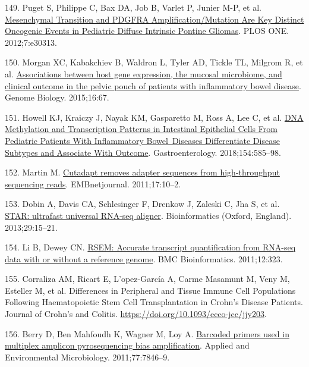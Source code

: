 \documentclass[
  12pt,
  a4paper,
  twoside,
  openright]{book}
\newlength{\cslhangindent}
\newlength{\cslentryspacingunit} %
\newenvironment{CSLReferences}[2] %
 {%
  \setlength{\parindent}{0pt}
  \ifodd #1
  \let\oldpar\par
  \def\par{\hangindent=\cslhangindent\oldpar}
  \fi
  \setlength{\parskip}{#2\cslentryspacingunit}
 }%
 {}
\begin{document}
\begin{CSLReferences}{0}{0}
\leavevmode{}%
149. Puget S, Philippe C, Bax DA, Job B, Varlet P, Junier M-P, et al. \href{https://doi.org/10.1371/journal.pone.0030313}{Mesenchymal Transition and PDGFRA Amplification/Mutation Are Key Distinct Oncogenic Events in Pediatric Diffuse Intrinsic Pontine Gliomas}. PLOS ONE. 2012;7:e30313.

\leavevmode{}%
150. Morgan XC, Kabakchiev B, Waldron L, Tyler AD, Tickle TL, Milgrom R, et al. \href{https://doi.org/10.1186/s13059-015-0637-x}{Associations between host gene expression, the mucosal microbiome, and clinical outcome in the pelvic pouch of patients with inflammatory bowel disease}. Genome Biology. 2015;16:67.

\leavevmode{}%
151. Howell KJ, Kraiczy J, Nayak KM, Gasparetto M, Ross A, Lee C, et al. \href{https://doi.org/10.1053/j.gastro.2017.10.007}{DNA Methylation and Transcription Patterns in Intestinal Epithelial Cells From Pediatric Patients With Inflammatory Bowel~Diseases Differentiate Disease Subtypes and Associate With Outcome}. Gastroenterology. 2018;154:585--98.

\leavevmode{}%
152. Martin M. \href{https://doi.org/10.14806/ej.17.1.200}{Cutadapt removes adapter sequences from high-throughput sequencing reads}. EMBnetjournal. 2011;17:10--2.

\leavevmode{}%
153. Dobin A, Davis CA, Schlesinger F, Drenkow J, Zaleski C, Jha S, et al. \href{https://doi.org/10.1093/bioinformatics/bts635}{STAR: ultrafast universal RNA-seq aligner}. Bioinformatics (Oxford, England). 2013;29:15--21.

\leavevmode{}%
154. Li B, Dewey CN. \href{https://doi.org/10.1186/1471-2105-12-323}{RSEM: Accurate transcript quantification from RNA-seq data with or without a reference genome}. BMC Bioinformatics. 2011;12:323.

\leavevmode{}%
155. Corraliza AM, Ricart E, L'opez-García A, Carme Masamunt M, Veny M, Esteller M, et al. Differences in {Peripheral} and {Tissue Immune Cell Populations Following Haematopoietic Stem Cell Transplantation} in {Crohn}'s {Disease Patients}. Journal of Crohn's and Colitis. \url{https://doi.org/10.1093/ecco-jcc/jjy203}.

\leavevmode{}%
156. Berry D, Ben Mahfoudh K, Wagner M, Loy A. \href{https://doi.org/10.1128/AEM.05220-11}{Barcoded primers used in multiplex amplicon pyrosequencing bias amplification}. Applied and Environmental Microbiology. 2011;77:7846--9.


\end{CSLReferences}
\end{document}
